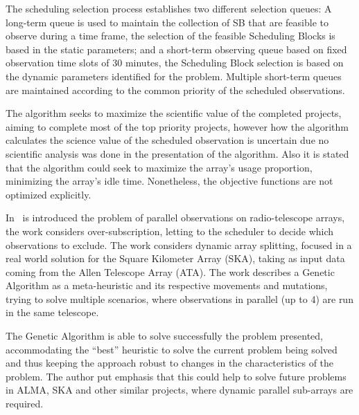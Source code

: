 The scheduling selection process establishes two different selection queues: A long-term queue is used to maintain the collection of SB that are feasible to observe during a time frame, the selection of the feasible Scheduling Blocks is based in the static parameters; and a short-term observing queue based on fixed observation time slots of 30 minutes, the Scheduling Block selection is based on the dynamic parameters identified for the problem. Multiple short-term queues are maintained according to the common priority of the scheduled observations.

The algorithm seeks to maximize the scientific value of the completed projects, aiming to complete most of the top priority projects, however how the algorithm calculates the science value of the scheduled observation is uncertain due no scientific analysis was done in the presentation of the algorithm. Also it is stated that the algorithm could seek to maximize the array's usage proportion, minimizing the array's idle time. Nonetheless, the objective functions are not optimized explicitly.

In~\cite{buchner2011dynamic} is introduced the problem of parallel observations on radio-telescope arrays, the work considers over-subscription, letting to the scheduler to decide which observations to exclude. The work considers dynamic array splitting, focused in a real world solution for the Square Kilometer Array (SKA), taking as input data coming from the Allen Telescope Array (ATA). The work describes a Genetic Algorithm as a meta-heuristic and its respective movements and mutations, trying to solve multiple scenarios, where observations in parallel (up to 4) are run in the same telescope.

The Genetic Algorithm is able to solve successfully the problem presented, accommodating the ``best'' heuristic to solve the current problem being solved and thus keeping the approach robust to changes in the characteristics of the problem. The author put emphasis that this could help to solve future problems in ALMA, SKA and other similar projects, where dynamic parallel sub-arrays are required.